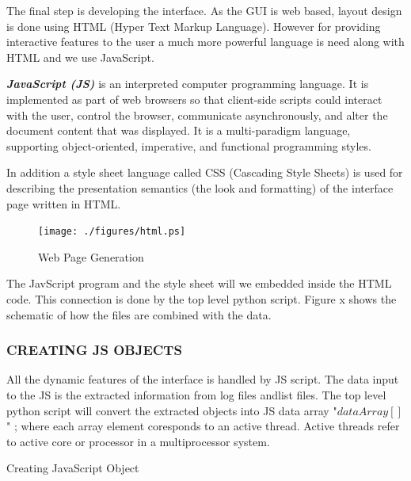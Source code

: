 The final step is developing the interface. As the GUI is web based, layout design is done using HTML (Hyper Text Markup Language). However for providing interactive features to the user a much more powerful language is need along with HTML and we use JavaScript.

\emph {\bf JavaScript (JS)} is an interpreted computer programming language. It is  implemented as part of web browsers so that client-side scripts could interact with the user, control the browser, communicate asynchronously, and alter the document content that was displayed. It is a multi-paradigm language, supporting object-oriented, imperative, and functional programming styles.

In addition a style sheet language called CSS (Cascading Style Sheets) is used for describing the presentation semantics (the look and formatting) of the interface page written in HTML.
\begin{figure}[H]
\centering
\texttt{[image: ./figures/html.ps]}
\caption{Web Page Generation}
\end{figure}


The JavScript program and the style sheet will we embedded inside the HTML code. This connection is done by the top level python script. Figure x shows the schematic of how the files are combined with the data.



\subsubsection{CREATING JS OBJECTS}
All the dynamic features of the interface is handled by JS script. The data input to the JS is the extracted information from log files andlist files. The top level python script will convert the extracted objects into JS data array "$dataArray[]$" ; where each array element coresponds to an active thread. Active threads refer to active core or processor in a multiprocessor system.  

\IncMargin{1em}
\begin{algorithm}[H]
\DontPrintSemicolon
{} 
\KwFn {}
\BlankLine
{}
\caption{Creating JavaScript Object}
\end{algorithm}\DecMargin{1em}



